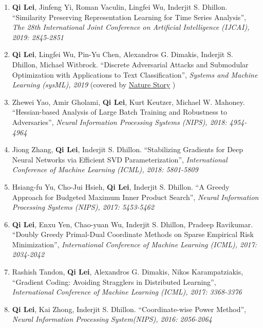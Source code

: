 \documentclass[margin, 10pt]{res} %
\begin{document}
\begin{resume}
\begin{enumerate}
  \item{ \textbf{Qi Lei}, Jinfeng Yi, Roman Vaculin, Lingfei Wu, Inderjit S. 
      Dhillon. ``Similarity Preserving Representation Learning for Time Series 
      Analysis'', \textit{The 28th International Joint Conference on Artificial 
    Intelligence (IJCAI), 2019: 2845-2851}}
  \item{\textbf{Qi Lei}, Lingfei Wu, Pin-Yu Chen, Alexandros G. Dimakis, Inderjit S. 
    Dhillon, Michael Witbrock. ``Discrete Adversarial Attacks and Submodular 
    Optimization with Applications to Text Classification'', \textit{Systems and Machine 
  Learning (sysML), 2019} (covered by \href{https://www.nature.com/articles/d41586-019-01510-1}{Nature Story} )   }
\item{Zhewei Yao, Amir Gholami, \textbf{Qi Lei}, Kurt Keutzer, Michael W. 
  Mahoney. ``Hessian-based Analysis of Large Batch Training and Robustness to 
Adversaries'', \textit{Neural Information Processing Systems (NIPS), 2018: 4954-4964}}
  \item{Jiong Zhang, \textbf{Qi Lei}, Inderjit S. Dhillon. 
        ``Stabilizing Gradients for Deep 
       Neural Networks via Efficient SVD Parameterization'', \textit{
    International Conference of Machine Learning (ICML), 2018: 5801-5809}}
\item{Hsiang-fu Yu, Cho-Jui Hsieh, \textbf{Qi Lei}, Inderjit S. Dhillon. 
      ``A Greedy Approach for Budgeted Maximum 
      Inner Product Search'', \textit{Neural Information Processing Systems 
      (NIPS), 2017: 5453-5462}}
    \item{\textbf{Qi Lei}, Enxu Yen, Chao-yuan Wu, Inderjit S. Dhillon, Pradeep 
        Ravikumar. ``Doubly Greedy Primal-Dual Coordinate Methods on Sparse Empirical 
  Risk Minimization'', \textit{International Conference of Machine 
    Learning (ICML), 2017: 2034-2042}}
\item{Rashish Tandon, \textbf{Qi Lei}, 
    Alexandros G. Dimakis, Nikos Karampatziakis, ``Gradient Coding: Avoiding 
    Stragglers in Distributed Learning'', \textit{International Conference of 
  Machine Learning (ICML), 2017: 3368-3376}}
  \item {\textbf{Qi Lei},
      Kai Zhong, Inderjit S. Dhillon. ``Coordinate-wise Power Method'', 
  \textit{Neural Information Processing System(NIPS), 2016: 2056-2064}}		


\end{enumerate}
\end{resume}
\end{document}
